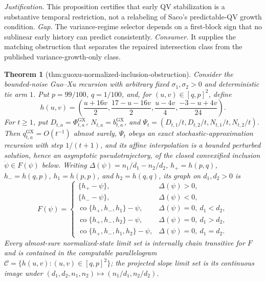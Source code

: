 \documentclass{article}
\newtheorem{theorem}{Theorem}
\begin{document}
\par\smallskip\noindent \textit{Justification.} This proposition certifies that early QV stabilization is a substantive temporal restriction, not a relabeling of Saco's predictable-QV growth condition. \textit{Gap.} The variance-regime selector depends on a first-block sign that no sublinear early history can predict consistently. \textit{Consumer.} It supplies the matching obstruction that separates the repaired intersection class from the published variance-growth-only class.

\begin{theorem}[thm:guoxu-normalized-inclusion-obstruction]\label{thm:guoxu-normalized-inclusion-obstruction}
Consider the bounded-noise Guo--Xu recursion with arbitrary fixed \(\sigma_1,\sigma_2>0\) and deterministic tie arm \(1\). Put \(p=99/100\), \(q=1/100\), and, for \((u,v)\in[q,p]^2\), define
\[
 h(u,v)=\left(\frac{u+16v}{2},\frac{17-u-16v}{2},
                 \frac{u-4v}{4},\frac{-3-u+4v}{24}\right).
\]
For \(t\ge1\), put \(D_{t,a}=\Phi^{\mathrm{GX}}_{t,a}\), \(N_{t,a}=b^{\mathrm{GX}}_{t,a}\), and \(\Psi_t=(D_{t,1}/t,D_{t,2}/t,N_{t,1}/t,N_{t,2}/t)\). Then \(q^{\mathrm{GX}}_{t,a}=O(t^{-1})\) almost surely, \(\Psi_t\) obeys an exact stochastic-approximation recursion with step \(1/(t+1)\), and its affine interpolation is a bounded perturbed solution, hence an asymptotic pseudotrajectory, of the closed convexified inclusion \(\dot\psi\in F(\psi)\) below. Writing \(\Delta(\psi)=n_1/d_1-n_2/d_2\), \(h_+=h(p,q)\), \(h_-=h(q,p)\), \(h_1=h(p,p)\), and \(h_2=h(q,q)\), its graph on \(d_1,d_2>0\) is
\[
 F(\psi)=
 \begin{cases}
  \{h_+-\psi\},&\Delta(\psi)>0,\\
  \{h_--\psi\},&\Delta(\psi)<0,\\
  \operatorname{co}\{h_+,h_-,h_1\}-\psi,&\Delta(\psi)=0,\ d_1<d_2,\\
  \operatorname{co}\{h_+,h_-,h_2\}-\psi,&\Delta(\psi)=0,\ d_1>d_2,\\
  \operatorname{co}\{h_+,h_-,h_1,h_2\}-\psi,&\Delta(\psi)=0,\ d_1=d_2.
 \end{cases}
\]
Every almost-sure normalized-state limit set is internally chain transitive for \(F\) and is contained in the computable parallelogram \(\mathcal C=\{h(u,v):(u,v)\in[q,p]^2\}\); the projected slope limit set is its continuous image under \((d_1,d_2,n_1,n_2)\mapsto(n_1/d_1,n_2/d_2)\).


\end{theorem}
\end{document}
